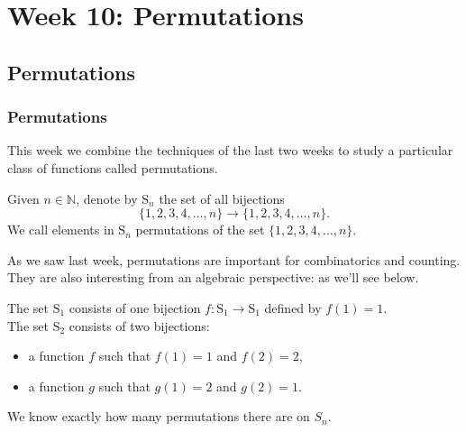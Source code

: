\documentclass[11pt,dvipsnames]{book}
\numberwithin{figure}{section} %
\numberwithin{table}{section} %
\begin{document}



\part{Week 10: Permutations}




\chapter{Permutations}%
\label{permutations}

\section{Permutations}%
\label{permutationssection}

This week we combine the techniques of the last two weeks to study a particular class of functions called permutations. 

\begin{definition}
Given $n\in\mathbb{N}$, denote by $\mathrm{S}_{n}$ the set of all bijections
$$
\big\{1,2,3,4,\ldots,n\big\}\longrightarrow\big\{1,2,3,4,\ldots,n\big\}.
$$
 We call elements in $\mathrm{S}_{n}$ \textcolor[rgb]{0.98,0.00,0.00}{permutations} of the set $\{1,2,3,4,\ldots,n\}$.
\end{definition}

As we saw last week, permutations are important for combinatorics and counting. They are also interesting from an algebraic perspective: as we'll see below.


 \begin{example}  
The set $\mathrm{S}_{1}$ consists of one
bijection $f:\mathrm{S}_{1}\rightarrow\mathrm{S}_{1}$ defined by $f(1)=1$.\\

The set $\mathrm{S}_{2}$ consists of two
bijections:
\begin{itemize}%
\item a function $f$ such that $f(1)=1$ and $f(2)=2$,%
\item a function $g$ such that $g(1)=2$ and $g(2)=1$.%
\end{itemize}
\end{example}

We know exactly how many permutations there are on $S_{n}$.
\end{document}
